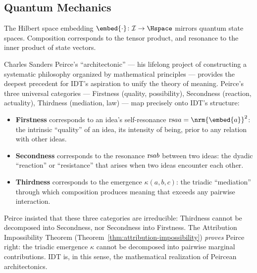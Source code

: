 \subsection{Quantum Mechanics}
The Hilbert space embedding $\embed{\cdot}\colon \IS \to \Hspace$ mirrors
quantum state spaces.  Composition corresponds to the tensor product, and
resonance to the inner product of state vectors.

\begin{interpretation}
\label{interp:ch22:peirce_architectonic}
Charles Sanders Peirce's ``architectonic'' --- his lifelong project of
constructing a systematic philosophy organized by mathematical principles
--- provides the deepest precedent for IDT's aspiration to unify
the theory of meaning.  Peirce's three universal categories ---
Firstness (quality, possibility), Secondness (reaction, actuality),
Thirdness (mediation, law) --- map precisely onto IDT's structure:
\begin{itemize}
  \item \textbf{Firstness} corresponds to an idea's self-resonance
  $\rs{a}{a} = \nrm{\embed{a}}^2$: the intrinsic ``quality'' of an
  idea, its intensity of being, prior to any relation with other ideas.
  \item \textbf{Secondness} corresponds to the resonance $\mathrm{rs}{a}{b}$
  between two ideas: the dyadic ``reaction'' or ``resistance'' that
  arises when two ideas encounter each other.
  \item \textbf{Thirdness} corresponds to the emergence $\kappa(a,b,c)$:
  the triadic ``mediation'' through which composition produces meaning
  that exceeds any pairwise interaction.
\end{itemize}
Peirce insisted that these three categories are irreducible: Thirdness
cannot be decomposed into Secondness, nor Secondness into Firstness.
The Attribution Impossibility Theorem (Theorem~\ref{thm:attribution-impossibility})
\emph{proves} Peirce right: the triadic emergence $\kappa$ cannot be
decomposed into pairwise marginal contributions.  IDT is, in this sense,
the mathematical realization of Peircean architectonics.


\end{interpretation}
